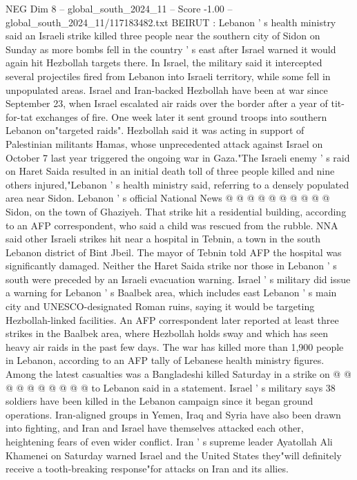 \begin{textsample}{NEG Dim 8 – global\_south\_2024\_11 – Score -1.00 – global\_south\_2024\_11/117183482.txt}  \label{ex:f8_neg_291}
BEIRUT : Lebanon ' s health ministry said an Israeli strike killed three people near the southern city of Sidon on Sunday as more bombs fell in the country ' s east after Israel warned it would again hit Hezbollah targets there.
In Israel, the military said it intercepted several projectiles fired from Lebanon into Israeli territory, while some fell in unpopulated areas.
Israel and Iran-backed Hezbollah have been at war since September 23, when Israel escalated air raids over the border after a year of tit-for-tat exchanges of fire.
One week later it sent ground troops into southern Lebanon on"targeted raids".
Hezbollah said it was acting in support of Palestinian militants Hamas, whose unprecedented attack against Israel on October 7 last year triggered the ongoing war in Gaza."The Israeli enemy ' s raid on Haret Saida resulted in an initial death toll of three people killed and nine others injured,"Lebanon ' s health ministry said, referring to a densely populated area near Sidon.
Lebanon ' s official National News @ @ @ @ @ @ @ @ @ @ Sidon, on the town of Ghaziyeh.
That strike hit a residential building, according to an AFP correspondent, who said a child was rescued from the rubble.
NNA said other Israeli strikes hit near a hospital in Tebnin, a town in the south Lebanon district of Bint Jbeil.
The mayor of Tebnin told AFP the hospital was significantly damaged.
Neither the Haret Saida strike nor those in Lebanon ' s south were preceded by an Israeli evacuation warning.
Israel ' s military did issue a warning for Lebanon ' s Baalbek area, which includes east Lebanon ' s main city and UNESCO-designated Roman ruins, saying it would be targeting Hezbollah-linked facilities.
An AFP correspondent later reported at least three strikes in the Baalbek area, where Hezbollah holds sway and which has seen heavy air raids in the past few days.
The war has killed more than 1,900 people in Lebanon, according to an AFP tally of Lebanese health ministry figures.
Among the latest casualties was a Bangladeshi killed Saturday in a strike on @ @ @ @ @ @ @ @ @ @ to Lebanon said in a statement.
Israel ' s military says 38 soldiers have been killed in the Lebanon campaign since it began ground operations.
Iran-aligned groups in Yemen, Iraq and Syria have also been drawn into fighting, and Iran and Israel have themselves attacked each other, heightening fears of even wider conflict.
Iran ' s supreme leader Ayatollah Ali Khamenei on Saturday warned Israel and the United States they"will definitely receive a tooth-breaking response"for attacks on Iran and its allies.

\end{textsample}
